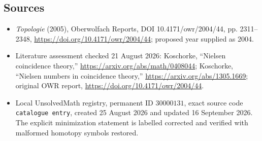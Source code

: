 \documentclass[11pt]{article}
\begin{document}
\subsection{Sources}
\begin{itemize}
\item \emph{Topologie} (2005), Oberwolfach Reports, DOI 10.4171/owr/2004/44, pp. 2311--2348, \url{https://doi.org/10.4171/owr/2004/44}; proposed year supplied as 2004.
\item Literature assessment checked 21 August 2026: Koschorke, ``Nielsen coincidence theory,'' \url{https://arxiv.org/abs/math/0408044}; Koschorke, ``Nielsen numbers in coincidence theory,'' \url{https://arxiv.org/abs/1305.1669}; original OWR report, \url{https://doi.org/10.4171/owr/2004/44}.
\item Local UnsolvedMath registry, permanent ID $30000131$, exact source code \texttt{catalogue entry}, created 25 August 2026 and updated 16 September 2026. The explicit minimization statement is labelled corrected and verified with malformed homotopy symbols restored.
\end{itemize}
\end{document}
